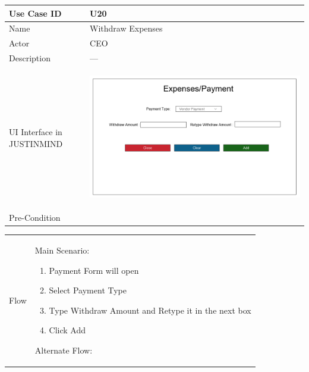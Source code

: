 \documentclass[12pt,a4paper]{report}
\begin{document}
\begin{tabular}{ | m{3cm} | m{12cm}| } \hline

Use Case ID & U20  \\\hline

Name  	    &  Withdraw Expenses \\ \hline

Actor     	&  CEO \\ \hline

Description & --- \\ \hline

UI Interface in JUSTINMIND & \begin{center} \includegraphics[scale=0.3]{./UIs for Latex Reports/UI-027 Add Withdraw Expenses@1x.png}\end{center}  \\ \hline

Pre-Condition &   \\ \hline

\end{tabular} \newpage \begin{tabular}{ | m{3cm} | m{12cm}| }  \hline
Flow & Main Scenario:

\begin{enumerate}
\item   Payment Form will open
\item Select Payment Type
\item Type Withdraw Amount and Retype it in the next box
\item Click Add


\end{enumerate}

Alternate Flow:


\end{tabular}
\end{document}

